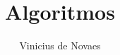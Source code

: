 \documentclass[11pt,aspectratio=43]{beamer}
\author{Vinicius de Novaes}
\title{Algoritmos}
\date{}
\begin{document}
\begin{frame}
\titlepage
\end{frame}

%









\end{document}
